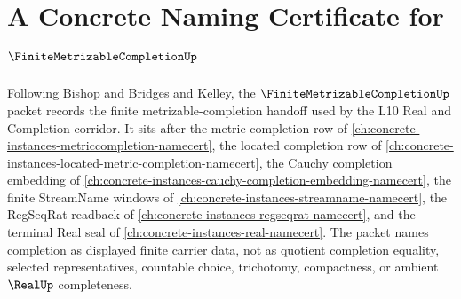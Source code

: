 \chapter{A Concrete Naming Certificate for $\FiniteMetrizableCompletionUp$}
\label{ch:concrete-instances-finite-metrizable-completion-namecert}

Following Bishop and Bridges and Kelley, the $\FiniteMetrizableCompletionUp$ packet records the finite metrizable-completion handoff used by the L10 Real and Completion corridor. It sits after the metric-completion row of \autoref{ch:concrete-instances-metriccompletion-namecert}, the located completion row of \autoref{ch:concrete-instances-located-metric-completion-namecert}, the Cauchy completion embedding of \autoref{ch:concrete-instances-cauchy-completion-embedding-namecert}, the finite StreamName windows of \autoref{ch:concrete-instances-streamname-namecert}, the RegSeqRat readback of \autoref{ch:concrete-instances-regseqrat-namecert}, and the terminal Real seal of \autoref{ch:concrete-instances-real-namecert}. The packet names completion as displayed finite carrier data, not as quotient completion equality, selected representatives, countable choice, trichotomy, compactness, or ambient $\RealUp$ completeness.

